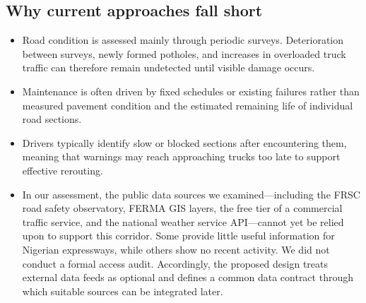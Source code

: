\documentclass[11pt,a4paper]{article}
\begin{document}
\subsection{Why current approaches fall short}
\begin{itemize}
\item Road condition is assessed mainly through periodic surveys. Deterioration between surveys, newly formed potholes, and increases in overloaded truck traffic can therefore remain undetected until visible damage occurs.
\item Maintenance is often driven by fixed schedules or existing failures rather than measured pavement condition and the estimated remaining life of individual road sections.
\item Drivers typically identify slow or blocked sections after encountering them, meaning that warnings may reach approaching trucks too late to support effective rerouting.
\item In our assessment, the public data sources we examined---including the FRSC road safety observatory, FERMA GIS layers, the free tier of a commercial traffic service, and the national weather service API---cannot yet be relied upon to support this corridor. Some provide little useful information for Nigerian expressways, while others show no recent activity. We did not conduct a formal access audit. Accordingly, the proposed design treats external data feeds as optional and defines a common data contract through which suitable sources can be integrated later.
\end{itemize}
\end{document}
